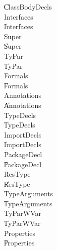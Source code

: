 {\begin{grammar}

    \| ClassBodyDecls\\
 Interfaces\opt  \: \\
    \| Interfaces\\
 Super\opt  \: \\
    \| Super\\
 TyPar\opt  \: \\
    \| TyPar\\
 Formals\opt  \: \\
    \| Formals\\
 Annotations\opt  \: \\
    \| Annotations\\
 TypeDecls\opt  \: \\
    \| TypeDecls\\
 ImportDecls\opt  \: \\
    \| ImportDecls\\
 PackageDecl\opt  \: \\
    \| PackageDecl\\
 ResType\opt  \: \\
    \| ResType\\
 TypeArguments\opt  \: \\
    \| TypeArguments\\
 TyParWVar\opt  \: \\
    \| TyParWVar\\
 Properties\opt  \: \\
    \| Properties\\
\end{grammar}


}
